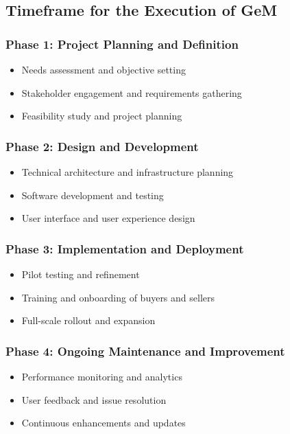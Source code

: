 \subsection{Timeframe for the Execution of GeM}

\subsubsection{Phase 1: Project Planning and Definition}

\begin{itemize}
    \item Needs assessment and objective setting
    \item Stakeholder engagement and requirements gathering
    \item Feasibility study and project planning
\end{itemize}

\subsubsection{Phase 2: Design and Development}

\begin{itemize}
    \item Technical architecture and infrastructure planning
    \item Software development and testing
    \item User interface and user experience design
\end{itemize}

\subsubsection{Phase 3: Implementation and Deployment}

\begin{itemize}
    \item Pilot testing and refinement
    \item Training and onboarding of buyers and sellers
    \item Full-scale rollout and expansion
\end{itemize}

\subsubsection{Phase 4: Ongoing Maintenance and Improvement}

\begin{itemize}
    \item Performance monitoring and analytics
    \item User feedback and issue resolution
    \item Continuous enhancements and updates
\end{itemize}

